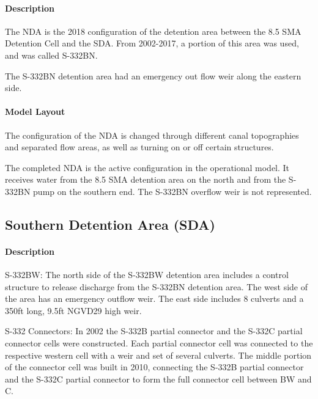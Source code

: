 \paragraph{Description}
The NDA is the 2018 configuration of the detention area between the 8.5 SMA Detention Cell and the SDA. From 2002-2017, a portion of this area was used, and was called S-332BN.

The S-332BN detention area had an emergency out flow weir along the eastern side.

\paragraph{Model Layout}

The configuration of the NDA is changed through different canal topographies and separated flow areas, as well as turning on or off certain structures.

The completed NDA is the active configuration in the operational model. It receives water from the 8.5 SMA detention area on the north and from the S-332BN pump on the southern end. The S-332BN overflow weir is not represented.



\clearpage
\subsection{Southern Detention Area (SDA)}

\paragraph{Description}

S-332BW: The north side of the S-332BW detention area includes a control structure to release discharge from the S-332BN detention area. The west side of the area has an emergency outflow weir. The east side includes 8 culverts and a 350ft long, 9.5ft NGVD29 high weir.

S-332 Connectors: In 2002 the S-332B partial connector and the S-332C partial connector cells were constructed. Each partial connector cell was connected to the respective western cell with a weir and set of several culverts. The middle portion of the connector cell was built in 2010, connecting the S-332B partial connector and the S-332C partial connector to form the full connector cell between BW and C.

